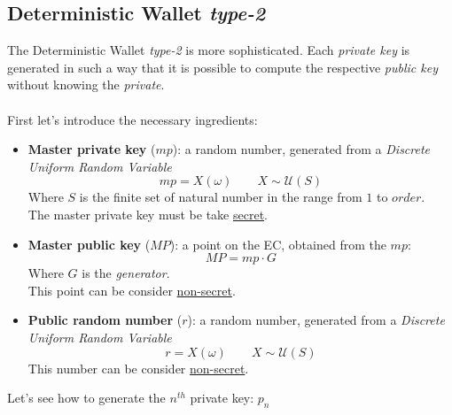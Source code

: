 \subsection{Deterministic Wallet \textit{type-2}}
The Deterministic Wallet \textit{type-2} is more sophisticated. Each \textit{private key} is generated in such a way that it is possible to compute the respective \textit{public key} without knowing the \textit{private}.
\\ \\
First let's introduce the necessary ingredients:
\begin{itemize}[label=$\diamond$]
	\item \textbf{Master private key} ($mp$): a random number, generated from a \textit{Discrete Uniform Random Variable}
	\begin{equation*}
	mp=X(\omega) \qquad X\sim \mathcal{U}(S)
	\end{equation*}
	Where $S$ is the finite set of natural number in the range from $1$ to $order$. \\ The master private key must be take \underline{secret}.
	\item \textbf{Master public key} ($MP$): a point on the EC, obtained from the $mp$:
	\begin{equation*}
	MP=mp\cdot G
	\end{equation*}
	Where $G$ is the \textit{generator}.\\ This point can be consider \underline{non-secret}.
	\item \textbf{Public random number} ($r$): a random number, generated from a \textit{Discrete Uniform Random Variable}
	\begin{equation*}
	r=X(\omega) \qquad X\sim \mathcal{U}(S)
	\end{equation*}
	This number can be consider \underline{non-secret}.
\end{itemize}
Let's see how to generate the $n^{th}$ private key: $p_n$

